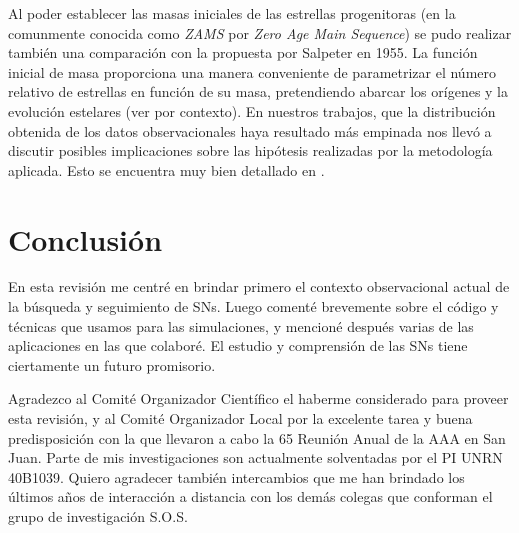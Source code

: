 \documentclass[baaa]{baaa}
\begin{document}
Al poder establecer las masas iniciales de las estrellas progenitoras (en la comunmente conocida como {\em ZAMS} por {\em Zero Age Main Sequence}) se pudo realizar también una comparación con la propuesta por Salpeter en 1955. La función inicial de masa proporciona una manera conveniente de parametrizar el número relativo de estrellas en función de su masa, pretendiendo abarcar los orígenes y la evolución estelares (ver \citealt{2010Bastian} por contexto). En nuestros trabajos, que la distribución obtenida de los datos observacionales haya resultado más empinada nos llevó a discutir posibles implicaciones sobre las hipótesis realizadas por la metodología aplicada. Esto se encuentra muy bien detallado en \cite{tesisLaurean}.


\section{Conclusión}

En esta revisión me centré en brindar primero el contexto observacional actual de la búsqueda y seguimiento de SNs. Luego comenté brevemente sobre el código y técnicas que usamos para las simulaciones, y mencioné después varias de las aplicaciones en las que colaboré. El estudio y comprensión de las SNs tiene ciertamente un futuro promisorio.


\begin{acknowledgement}
Agradezco al Comité Organizador Científico el haberme considerado para proveer esta revisión, y al Comité Organizador Local por la excelente tarea y buena predisposición con la que llevaron a cabo la 65 Reunión Anual de la AAA en San Juan.
Parte de mis investigaciones son actualmente solventadas por el PI UNRN 40B1039.
Quiero agradecer también intercambios que me han brindado los últimos años de interacción a distancia con los demás colegas que conforman el grupo de investigación S.O.S.
\end{acknowledgement}



\small

 
\end{document}
